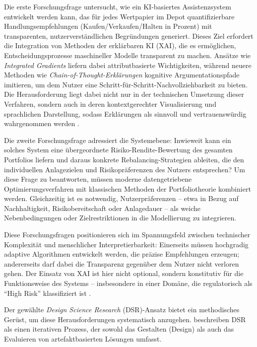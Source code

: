     Die erste Forschungsfrage untersucht, wie ein KI-basiertes Assistenzsystem entwickelt werden kann, das für jedes Wertpapier im Depot quantifizierbare Handlungsempfehlungen (Kaufen/Verkaufen/Halten in Prozent) mit transparenten, nutzerverständlichen Begründungen generiert.
    Dieses Ziel erfordert die Integration von Methoden der erklärbaren KI (XAI), die es ermöglichen, Entscheidungsprozesse maschineller Modelle transparent zu machen.
    Ansätze wie \textit{Integrated Gradients} liefern dabei attributbasierte Wichtigkeiten, während neuere Methoden wie \textit{Chain-of-Thought-Erklärungen} \autocite{wei2022} kognitive Argumentationspfade imitieren, um dem Nutzer eine Schritt-für-Schritt-Nachvollziehbarkeit zu bieten.
    Die Herausforderung liegt dabei nicht nur in der technischen Umsetzung dieser Verfahren, sondern auch in deren kontextgerechter Visualisierung und sprachlichen Darstellung, sodass Erklärungen als sinnvoll und vertrauenswürdig wahrgenommen werden \autocite{Liao2022, Rong2022}.

    Die zweite Forschungsfrage adressiert die Systemebene:
    Inwieweit kann ein solches System eine übergeordnete Risiko-Rendite-Bewertung des gesamten Portfolios liefern und daraus konkrete Rebalancing-Strategien ableiten, die den individuellen Anlagezielen und Risikopräferenzen des Nutzers entsprechen?
    Um diese Frage zu beantworten, müssen moderne datengetriebene Optimierungsverfahren mit klassischen Methoden der Portfoliotheorie kombiniert werden.
    Gleichzeitig ist es notwendig, Nutzerpräferenzen -- etwa in Bezug auf Nachhaltigkeit, Risikobereitschaft oder Anlagedauer -- als weiche Nebenbedingungen oder Zielrestriktionen in die Modellierung zu integrieren.

    Diese Forschungsfragen positionieren sich im Spannungsfeld zwischen technischer Komplexität und menschlicher Interpretierbarkeit:
    Einerseits müssen hochgradig adaptive Algorithmen entwickelt werden, die präzise Empfehlungen erzeugen; andererseits darf dabei die Transparenz gegenüber dem Nutzer nicht verloren gehen.
    Der Einsatz von \acs{XAI} ist hier nicht optional, sondern konstitutiv für die Funktionsweise des Systems – insbesondere in einer Domäne, die regulatorisch als \enquote{High Risk} klassifiziert ist \autocite{Weber2024}.

    Der gewählte \textit{Design Science Research} (\acs{DSR})-Ansatz bietet ein methodisches Gerüst, um diese Herausforderungen systematisch anzugehen.
    \textcite{hevner2004} beschreiben \acs{DSR} als einen iterativen Prozess, der sowohl das Gestalten (Design) als auch das Evaluieren von artefaktbasierten Lösungen umfasst.

